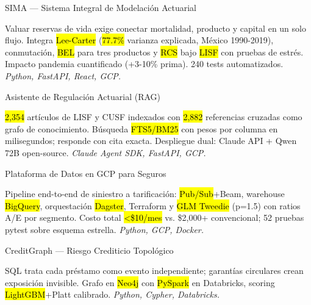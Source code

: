 \documentclass[10pt, letterpaper]{awesome-cv}
\begin{document}
\begin{cventries}

  \cventry
    {SIMA — Sistema Integral de Modelación Actuarial}
    {}
    {}
    {}
    {
      \begin{cvitems}
        \item {Valuar reservas de vida exige conectar mortalidad, producto y capital en un solo flujo. Integra \hl{Lee-Carter} (\hl{77.7\%} varianza explicada, México 1990-2019), conmutación, \hl{BEL} para tres productos y \hl{RCS} bajo \hl{LISF} con pruebas de estrés. Impacto pandemia cuantificado (+3-10\% prima). 240 tests automatizados. \textit{Python, FastAPI, React, GCP.}}
      \end{cvitems}
    }

  \cventry
    {Asistente de Regulación Actuarial (RAG)}
    {}
    {}
    {}
    {
      \begin{cvitems}
        \item {\hl{2,354} artículos de LISF y CUSF indexados con \hl{2,882} referencias cruzadas como grafo de conocimiento. Búsqueda \hl{FTS5/BM25} con pesos por columna en milisegundos; responde con cita exacta. Despliegue dual: Claude API + Qwen 72B open-source. \textit{Claude Agent SDK, FastAPI, GCP.}}
      \end{cvitems}
    }

  \cventry
    {Plataforma de Datos en GCP para Seguros}
    {}
    {}
    {}
    {
      \begin{cvitems}
        \item {Pipeline end-to-end de siniestro a tarificación: \hl{Pub/Sub}+Beam, warehouse \hl{BigQuery}, orquestación \hl{Dagster}, Terraform y \hl{GLM Tweedie} (p=1.5) con ratios A/E por segmento. Costo total \hl{<\$10/mes} vs. \$2,000+ convencional; 52 pruebas pytest sobre esquema estrella. \textit{Python, GCP, Docker.}}
      \end{cvitems}
    }

  \cventry
    {CreditGraph — Riesgo Crediticio Topológico}
    {}
    {}
    {}
    {
      \begin{cvitems}
        \item {SQL trata cada préstamo como evento independiente; garantías circulares crean exposición invisible. Grafo en \hl{Neo4j} con \hl{PySpark} en Databricks, scoring \hl{LightGBM}+Platt calibrado. \textit{Python, Cypher, Databricks.}}
      \end{cvitems}
    }

\end{cventries}
\end{document}
